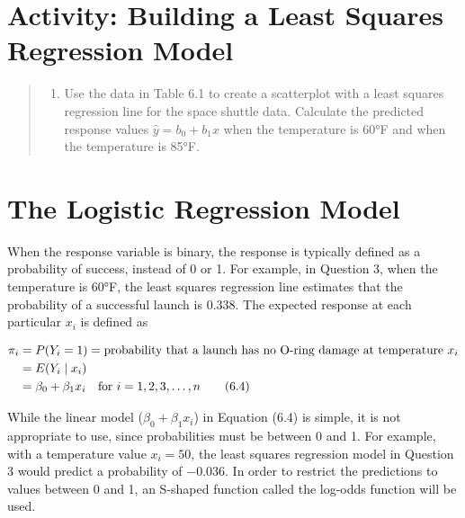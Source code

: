 \documentclass[
]{report}
\providecommand{\tightlist}{%
  \setlength{\itemsep}{0pt}\setlength{\parskip}{0pt}}
\begin{document}
\hypertarget{activity-building-a-least-squares-regression-model}{%
\section*{Activity: Building a Least Squares Regression Model}\label{activity-building-a-least-squares-regression-model}}

\begin{quote}
\begin{enumerate}
\def\labelenumi{\arabic{enumi}.}
\setcounter{enumi}{2}
\tightlist
\item
  Use the data in Table 6.1 to create a scatterplot with a least squares regression line for the space shuttle data. Calculate the predicted response values \(\hat y = b_0 + b_1 x\) when the temperature is 60°F and when the temperature is 85°F.
\end{enumerate}
\end{quote}

\hypertarget{the-logistic-regression-model}{%
\section{\texorpdfstring{\textbf{The Logistic Regression Model}}{The Logistic Regression Model}}\label{the-logistic-regression-model}}

When the response variable is binary, the response is typically defined as a probability of success, instead of 0 or 1. For example, in Question 3, when the temperature is 60°F, the least squares regression line estimates that the probability of a successful launch is 0.338. The expected response at each particular \(x_i\) is defined as

\begin{align}
\pi_i &= P(Y_i = 1) = \text{probability that a launch has no O-ring damage at temperature } x_i \notag \\
      &= E(Y_i \mid x_i) \notag \\
      &= \beta_0 + \beta_1 x_i \quad \text{for } i = 1,2,3,\dots,n \tag{6.4}
\end{align}

While the linear model (\(\beta_0 + \beta_1 x_i\)) in Equation (6.4) is simple, it is not appropriate to use, since probabilities must be between 0 and 1. For example, with a temperature value \(x_i = 50\), the least squares regression model in Question 3 would predict a probability of \(-0.036\). In order to restrict the predictions to values between 0 and 1, an S-shaped function called the log-odds function will be used.
\end{document}
